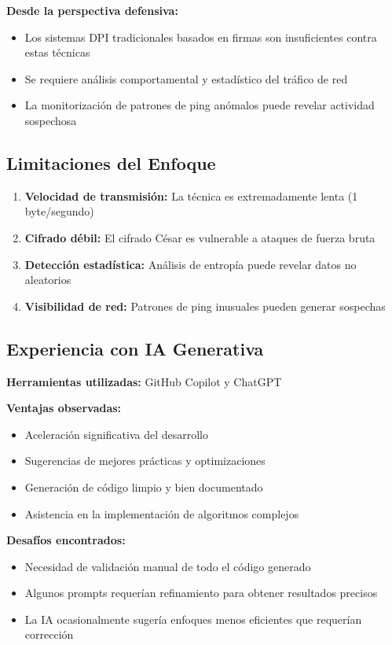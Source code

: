 \documentclass[letter,12pt]{article}
\begin{document}
\textbf{Desde la perspectiva defensiva:}
\begin{itemize}
    \item Los sistemas DPI tradicionales basados en firmas son insuficientes contra estas técnicas
    \item Se requiere análisis comportamental y estadístico del tráfico de red
    \item La monitorización de patrones de ping anómalos puede revelar actividad sospechosa
\end{itemize}

\subsection*{Limitaciones del Enfoque}

\begin{enumerate}
    \item \textbf{Velocidad de transmisión:} La técnica es extremadamente lenta (1 byte/segundo)
    \item \textbf{Cifrado débil:} El cifrado César es vulnerable a ataques de fuerza bruta
    \item \textbf{Detección estadística:} Análisis de entropía puede revelar datos no aleatorios
    \item \textbf{Visibilidad de red:} Patrones de ping inusuales pueden generar sospechas
\end{enumerate}

\subsection*{Experiencia con IA Generativa}

\textbf{Herramientas utilizadas:} GitHub Copilot y ChatGPT

\textbf{Ventajas observadas:}
\begin{itemize}
    \item Aceleración significativa del desarrollo
    \item Sugerencias de mejores prácticas y optimizaciones
    \item Generación de código limpio y bien documentado
    \item Asistencia en la implementación de algoritmos complejos
\end{itemize}

\textbf{Desafíos encontrados:}
\begin{itemize}
    \item Necesidad de validación manual de todo el código generado
    \item Algunos prompts requerían refinamiento para obtener resultados precisos
    \item La IA ocasionalmente sugería enfoques menos eficientes que requerían corrección
\end{itemize}
\end{document}
